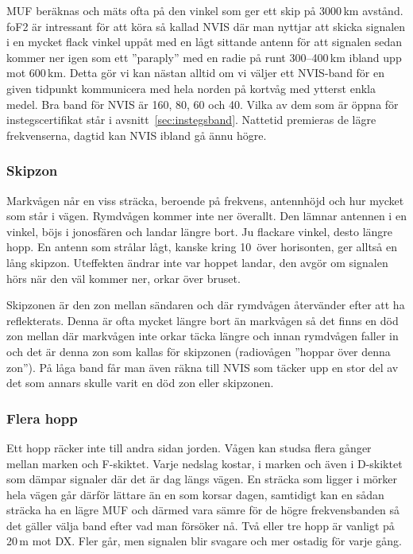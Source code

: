 MUF beräknas och mäts ofta på den vinkel som ger ett skip på 3000\,km
avstånd. foF2 är intressant för att köra så kallad NVIS där man
nyttjar att skicka signalen i en mycket flack vinkel uppåt med en lågt
sittande antenn för att signalen sedan kommer ner igen som ett
''paraply'' med en radie på runt 300--400\,km ibland upp mot
600\,km. Detta gör vi kan nästan alltid om vi väljer ett NVIS-band för
en given tidpunkt kommunicera med hela norden på kortvåg med ytterst
enkla medel. Bra band för NVIS är 160, 80, 60 och 40. Vilka av dem som är öppna
för instegscertifikat står i avsnitt~\ref{sec:instegsband}. Nattetid
premieras de lägre frekvenserna, dagtid kan NVIS ibland gå ännu högre.

\subsubsection{Skipzon}
\label{sec:skipzon}

Markvågen når en viss sträcka, beroende på frekvens, antennhöjd och
hur mycket som står i vägen. Rymdvågen kommer inte ner överallt. Den
lämnar antennen i en vinkel, böjs i jonosfären och landar längre
bort. Ju flackare vinkel, desto längre hopp. En antenn som strålar
lågt, kanske kring 10\textdegree\ över horisonten, ger alltså en lång
skipzon. Uteffekten ändrar inte var hoppet landar, den avgör om
signalen hörs när den väl kommer ner, orkar över bruset. 

Skipzonen är den zon mellan sändaren och där rymdvågen återvänder
efter att ha reflekterats. Denna är ofta mycket längre bort än
markvågen så det finns en död zon mellan där markvågen inte orkar
täcka längre och innan rymdvågen faller in och det är denna zon som
kallas för skipzonen (radiovågen ''hoppar över denna zon''). På låga
band får man även räkna till NVIS som täcker upp en stor del av det
som annars skulle varit en död zon eller skipzonen.

\subsubsection{Flera hopp}

Ett hopp räcker inte till andra sidan jorden. Vågen kan studsa flera
gånger mellan marken och F-skiktet. Varje nedslag kostar, i marken och
även i D-skiktet som dämpar signaler där det är dag längs vägen. En
sträcka som ligger i mörker hela vägen går därför lättare än en som
korsar dagen, samtidigt kan en sådan sträcka ha en lägre MUF och
därmed vara sämre för de högre frekvensbanden så det gäller välja band
efter vad man försöker nå. Två eller tre hopp är vanligt på 20\,m mot
DX. Fler går, men signalen blir svagare och mer ostadig för varje
gång.

